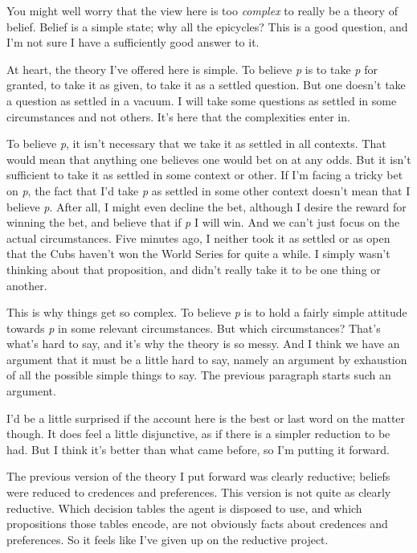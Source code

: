 \documentclass[
  11pt,
  letterpaper,
  DIV=11,
  numbers=noendperiod,
  twoside]{scrartcl}
\begin{document}
You might well worry that the view here is too \emph{complex} to really
be a theory of belief. Belief is a simple state; why all the epicycles?
This is a good question, and I'm not sure I have a sufficiently good
answer to it.

At heart, the theory I've offered here is simple. To believe \emph{p} is
to take \emph{p} for granted, to take it as given, to take it as a
settled question. But one doesn't take a question as settled in a
vacuum. I will take some questions as settled in some circumstances and
not others. It's here that the complexities enter in.

To believe \emph{p}, it isn't necessary that we take it as settled in
all contexts. That would mean that anything one believes one would bet
on at any odds. But it isn't sufficient to take it as settled in some
context or other. If I'm facing a tricky bet on \emph{p}, the fact that
I'd take \emph{p} as settled in some other context doesn't mean that I
believe \emph{p}. After all, I might even decline the bet, although I
desire the reward for winning the bet, and believe that if \emph{p} I
will win. And we can't just focus on the actual circumstances. Five
minutes ago, I neither took it as settled or as open that the Cubs
haven't won the World Series for quite a while. I simply wasn't thinking
about that proposition, and didn't really take it to be one thing or
another.

This is why things get so complex. To believe \emph{p} is to hold a
fairly simple attitude towards \emph{p} in some relevant circumstances.
But which circumstances? That's what's hard to say, and it's why the
theory is so messy. And I think we have an argument that it must be a
little hard to say, namely an argument by exhaustion of all the possible
simple things to say. The previous paragraph starts such an argument.

I'd be a little surprised if the account here is the best or last word
on the matter though. It does feel a little disjunctive, as if there is
a simpler reduction to be had. But I think it's better than what came
before, so I'm putting it forward.

The previous version of the theory I put forward was clearly reductive;
beliefs were reduced to credences and preferences. This version is not
quite as clearly reductive. Which decision tables the agent is disposed
to use, and which propositions those tables encode, are not obviously
facts about credences and preferences. So it feels like I've given up on
the reductive project.
\end{document}
